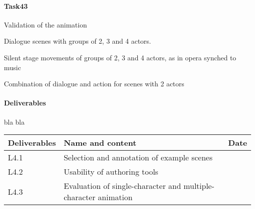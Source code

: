 \paragraph{Task43} Validation of the animation

Dialogue scenes  with groups of 2, 3 and 4 actors.

Silent stage movements of groups of 2, 3 and 4 actors, as in opera synched to music

Combination of dialogue and action for scenes with 2 actors


\paragraph{Deliverables}

bla bla


\begin{tabular}{|l|l|l|}\hline
Deliverables & Name and content  & Date  \\\hline
L4.1  & Selection and annotation of example scenes& \\\hline
L4.2  & Usability of authoring tools & \\\hline
L4.3  & Evaluation of single-character and multiple-character animation & \\\hline
\end{tabular}

\endinput

